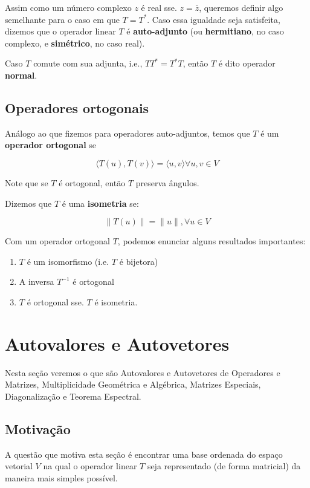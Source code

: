 \documentclass[12pt,a4paper]{article}
\begin{document}
Assim como um número complexo $z$ é real sse. $z = \bar{z}$, queremos definir algo semelhante para o caso em que $T = T^{\ast}$. Caso essa igualdade seja satisfeita, dizemos que o operador linear $T$ é \textbf{auto-adjunto} (ou \textbf{hermitiano}, no caso complexo, e \textbf{simétrico}, no caso real).

Caso $T$ comute com sua adjunta, i.e., $TT^{\ast} = T^{\ast}T$, então $T$ é dito operador \textbf{normal}.

\subsection{Operadores ortogonais}

Análogo ao que fizemos para operadores auto-adjuntos, temos que $T$ é um \textbf{operador ortogonal} se 

\[
\langle T(u), T(v) \rangle = \langle u, v \rangle \forall u, v \in V
\]

Note que se $T$ é ortogonal, então $T$ preserva ângulos.

Dizemos que $T$ é uma \textbf{isometria} se:

\[
\|T(u)\| = \| u \|, \forall u \in V
\]

Com um operador ortogonal $T$, podemos enunciar alguns resultados importantes:

\begin{enumerate}
\item $T$ é um isomorfismo (i.e. $T$ é bijetora)
\item A inversa $T^{-1}$ é ortogonal
\item $T$ é ortogonal sse. $T$ é isometria.
\end{enumerate}

\newpage
\section{Autovalores e Autovetores}

Nesta seção veremos o que são Autovalores e Autovetores de Operadores e Matrizes, Multiplicidade Geométrica e Algébrica, Matrizes Especiais, Diagonalização e Teorema Espectral.

\subsection{Motivação}

A questão que motiva esta seção é encontrar uma base ordenada do espaço vetorial $V$ na qual o operador linear $T$ seja representado (de forma matricial) da maneira mais simples possível.
\end{document}
